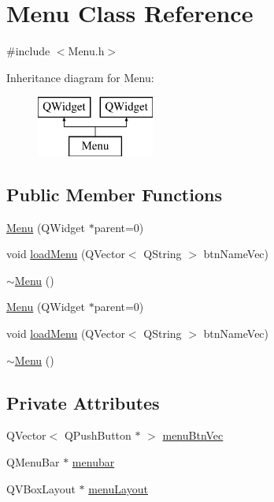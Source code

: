\hypertarget{class_menu}{\section{Menu Class Reference}
\label{class_menu}
}


{\ttfamily \#include $<$Menu.\-h$>$}

Inheritance diagram for Menu\-:\begin{figure}[H]
\begin{center}
\leavevmode
\includegraphics[height=2.000000cm]{class_menu}
\end{center}
\end{figure}
\subsection*{Public Member Functions}
\begin{DoxyCompactItemize}
\item 
\hyperlink{class_menu_aea36ff15ed756c91b7731a2025175f16}{Menu} (Q\-Widget $\ast$parent=0)
\item 
void \hyperlink{class_menu_a12d043d8401565cbf4e432af71ad3ca6}{load\-Menu} (Q\-Vector$<$ Q\-String $>$ btn\-Name\-Vec)
\item 
\hyperlink{class_menu_a831387f51358cfb88cd018e1777bc980}{$\sim$\-Menu} ()
\item 
\hyperlink{class_menu_aea36ff15ed756c91b7731a2025175f16}{Menu} (Q\-Widget $\ast$parent=0)
\item 
void \hyperlink{class_menu_a12d043d8401565cbf4e432af71ad3ca6}{load\-Menu} (Q\-Vector$<$ Q\-String $>$ btn\-Name\-Vec)
\item 
\hyperlink{class_menu_a831387f51358cfb88cd018e1777bc980}{$\sim$\-Menu} ()
\end{DoxyCompactItemize}
\subsection*{Private Attributes}
\begin{DoxyCompactItemize}
\item 
Q\-Vector$<$ Q\-Push\-Button $\ast$ $>$ \hyperlink{class_menu_a113fcfb2ce56c762473d0523c16f8a36}{menu\-Btn\-Vec}
\item 
Q\-Menu\-Bar $\ast$ \hyperlink{class_menu_a6b600fa41591d5f498aa1002de2801b9}{menubar}
\item 
Q\-V\-Box\-Layout $\ast$ \hyperlink{class_menu_add3aeb0f047a98113c9bc4de13fca17f}{menu\-Layout}
\end{DoxyCompactItemize}


